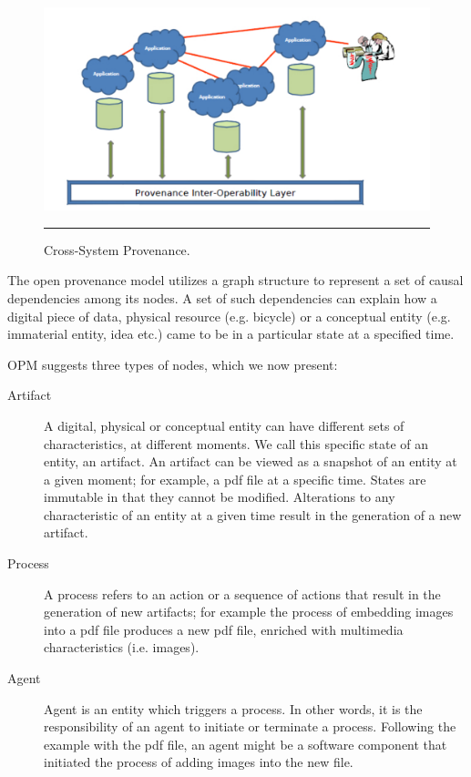 \begin{figure}[htbp]
	\centering
		\includegraphics[scale=0.60]{./Figures/chapter2/figure6.pdf}
		\rule{35em}{0.5pt}
	\caption[Cross-System Provenance]{Cross-System Provenance.\cite{reference1}}
	\label{fig:provAccrossSystems}
\end{figure}

The open provenance model utilizes a graph structure to represent a set of causal dependencies\cite{reference13} among its nodes. A set of such dependencies can explain how a digital piece of data, physical resource (e.g. bicycle) or a conceptual entity (e.g. immaterial entity, idea etc.) came to be in a particular state at a specified time.

OPM suggests three types of nodes, which we now present:

\begin{description}
  \item[Artifact]
         A digital, physical or conceptual entity can have different sets of characteristics, at different moments. We call this specific state of an entity, an artifact. An artifact can be viewed as a snapshot of an entity at a given moment; for example, a pdf file at a specific time. States are immutable in that they cannot be modified. Alterations to any characteristic of an entity at a given time result in the generation of a new artifact.
  \item[Process]
        A process refers to an action or a sequence of actions that result in the generation of new artifacts; for example the process of embedding images into a pdf file produces a new pdf file, enriched with multimedia characteristics (i.e. images).
  \item[Agent]
        Agent is an entity which triggers a process. In other words, it is the responsibility of an agent to initiate or terminate a process. Following the example with the pdf file, an agent might be a software component that initiated the process of adding images into the new file.
\end{description}

